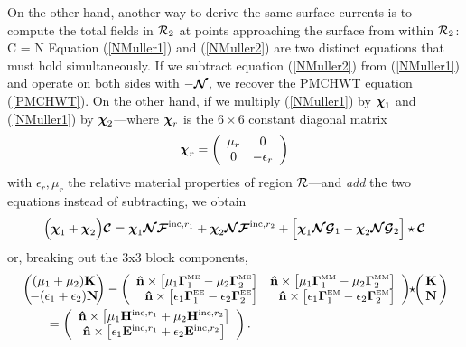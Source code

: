 On the other hand, another way to derive the same 
surface currents is to compute the total fields in $\mathcal{R}_2$ 
at points approaching the surface from within $\mathcal{R}_2$:
{\bmc C =
    \bmc N 
}
Equation (\ref{NMuller1}) and (\ref{NMuller2}) 
are two distinct equations that must hold simultaneously.
If we subtract equation (\ref{NMuller2}) from (\ref{NMuller1})
and operate on both sides with $-\boldsymbol{\mathcal{N}}$, we recover the
PMCHWT equation (\ref{PMCHWT}). On the other hand, 
if we multiply 
(\ref{NMuller1}) by $\boldsymbol{\chi}_1$ and 
(\ref{NMuller1}) by $\boldsymbol{\chi}_2$---where 
$\boldsymbol{\chi}_r$ is the $6\times 6$ constant diagonal matrix 
$$ \boldsymbol{\chi}_r 
   = 
   \left(\begin{array}{cc} 
      \mu_r & 0 \\ 
      0 & -\epsilon_r \end{array}\right)
$$
with $\epsilon_r,\mu_r$ the relative material properties of
region $\mathcal{R}$---and \textit{add} the two equations instead of
subtracting, we obtain
\renewcommand{\arraystretch}{1.5}
$$
 \Big(\boldsymbol{\chi}_1 + \boldsymbol{\chi}_2\Big)\boldsymbol{\mathcal{C}}
=    \boldsymbol{\chi}_1 \boldsymbol{\mathcal{N}} \boldsymbol{\mathcal{F}}^{\text{\scriptsize inc},r_1} 
   + \boldsymbol{\chi}_2 \boldsymbol{\mathcal{N}} \boldsymbol{\mathcal{F}}^{\text{\scriptsize inc},r_2} 
   + \Big[    \boldsymbol{\chi}_1 \boldsymbol{\mathcal{N}} \boldsymbol{\mathcal{G}}_1 
            - \boldsymbol{\chi}_2 \boldsymbol{\mathcal{N}} \boldsymbol{\mathcal{G}}_2
     \Big]\star \boldsymbol{\mathcal{C}}
$$
or, breaking out the 3x3 block components,
\begin{align}
&
\left(\begin{array}{c}
  \!\!\!\!
  (\mu_1      + \mu_2) \vb K
  \!\!\!\!
  \\
  \!\!\!\!
 -(\epsilon_1 + \epsilon_2) \vb N
  \!\!\!\! 
\end{array}\right)
-
\left(\begin{array}{cc}
  \vbhat{n}\times 
   \big[\mu_1 \BG\supt{ME}_1 - \mu_2 \BG\supt{ME}_2 \big]
&
  \vbhat{n}\times 
   \big[\mu_1 \BG\supt{MM}_1 - \mu_2 \BG\supt{MM}_2 \big]
\\
  \vbhat{n}\times 
   \big[\epsilon_1 \BG\supt{EE}_1 - \epsilon_2 \BG\supt{EE}_2 \big]
  \!\!\!\!
&
  \vbhat{n}\times 
   \big[\epsilon_1 \BG\supt{EM}_1 - \epsilon_2 \BG\supt{EM}_2 \big]
  \!\!\!\!
\end{array}\right) 
 \!\! \star \!\!
\left(\begin{array}{c}
  \!\!
  \vb K 
  \!\! 
  \\
  \!\!
  \vb N 
  \!\!
\end{array}\right)
\nn
&\qquad=
\left(\begin{array}{c}
  \vbhat{n}\times \big[\mu_1 \vb H\incro + \mu_2 \vb H\incrt\big] \\
  \vbhat{n}\times \big[\epsilon_1 \vb E\incro + \epsilon_2 \vb E\incrt\big]
\end{array}\right).
\label{NMuller0}
\end{align}
\renewcommand{\arraystretch}{1.0}

